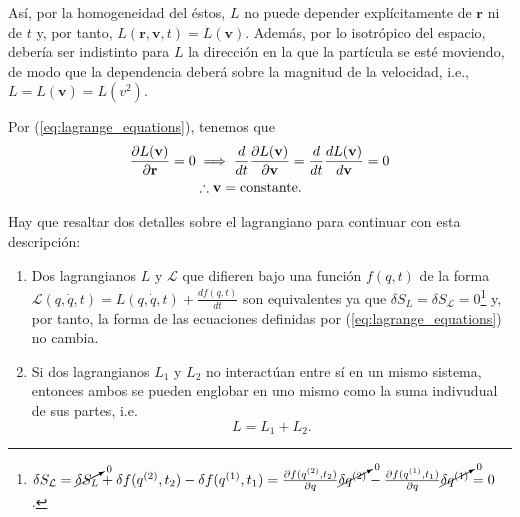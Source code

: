Así, por la homogeneidad del éstos, $L$ no puede depender explícitamente de $\mathbf{r}$ ni de $t$ y, por tanto, $L(\mathbf{r},\mathbf{v},t) = L(\mathbf{v})$. Además, por lo isotrópico del espacio, debería ser indistinto para $L$ la dirección en la que la partícula se esté moviendo, de modo que la dependencia deberá sobre la magnitud de la velocidad, i.e., $L = L(\mathbf{v}) = L(v^2)$.

Por (\ref{eq:lagrange_equations}), tenemos que 
 \begin{align*}
 \frac{\partial L(\mathbf{v}) }{\partial  \mathbf{r} } = 0 &\implies \frac{d}{dt}\frac{\partial L(\mathbf{v})}{\partial \mathbf{v}} = \frac{d}{dt} \frac{dL(\mathbf{v})}{d\mathbf{v}} = 0 \\ 
 &\therefore \mathbf{v} = \text{constante}.
 \end{align*}


Hay que resaltar dos detalles sobre el lagrangiano para continuar con esta descripción:
\begin{enumerate}

  \item Dos lagrangianos $L$ y $\mathcal{L}$ que difieren bajo una función $f(q,t)$ de la forma $\mathcal{L}(q,\dot{q},t) = L(q,\dot{q},t) + \frac{d f(q,t)}{dt}$ son equivalentes ya que $\delta S_{L} = \delta S_{\mathcal{L}} = 0$\footnote{$ \delta S_{\mathcal{L}} = \cancelto{0}{\delta S_L} + \delta f(q^{(2)},t_2) - \delta f(q^{(1)},t_1) = \frac{\partial f(q^{(2)},t_2)}{\partial q} \cancelto{0}{ \delta q^{(2)} } - \frac{\partial f(q^{(1)},t_1)}{\partial q} \cancelto{0}{ \delta q^{(1)} } = 0$.} y, por tanto, la forma de las ecuaciones definidas por (\ref{eq:lagrange_equations}) no cambia.

 \item Si dos lagrangianos $L_1$ y $L_2$ no interactúan entre sí en un mismo sistema, entonces ambos se pueden englobar en uno mismo como la suma indivudual de sus partes, i.e.
 \begin{equation}
  L = L_1 + L_2 .
  \label{eq:lagrangian_addititivy}
 \end{equation}
 
\end{enumerate}

